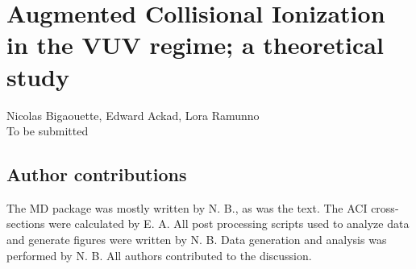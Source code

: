 
\newcommand{\PaperTitleHundrednm}{Augmented Collisional Ionization in the VUV regime; a theoretical study}

\section{\PaperTitleHundrednm}
\label{section:papers:100nm}

\begin{flushright}
Nicolas Bigaouette, Edward Ackad, Lora Ramunno\\
To be submitted
\end{flushright}

\HidePDFAbstractNumber

\subsection{Author contributions}
The MD package was mostly written by N. B., as was the text. The ACI cross-sections were calculated
by E. A. All post processing scripts used to analyze data and generate figures
were written by N. B. Data generation and analysis was performed by N. B.
All authors contributed to the discussion.



